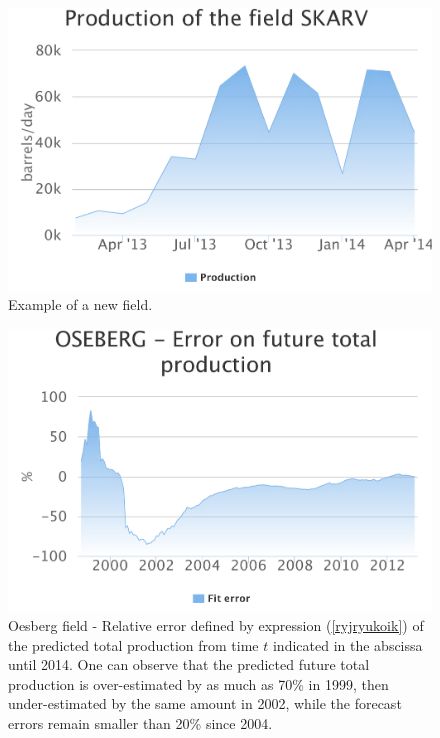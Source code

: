 \documentclass[review]{elsarticle}
\begin{document}
\pagebreak

\noindent 
\begin{figure}[H]
\includegraphics[width=1\columnwidth]{skarv}
\caption{Example of a new field.}
\label{new} 
\end{figure}


\noindent 
\begin{figure}[H]
\includegraphics[width=1\columnwidth]{oesberg-error}
\caption{\doublespacing
Oesberg field - Relative error defined by expression (\ref{ryjryukoik})
of the predicted total production from time $t$ indicated in the abscissa until 2014.
One can observe that the predicted future total production is over-estimated by as much
as 70\% in 1999, then under-estimated by the same amount in 2002, while the forecast
errors remain smaller than 20\% since 2004.}
\label{oesberg-error}
\end{figure}
\end{document}
